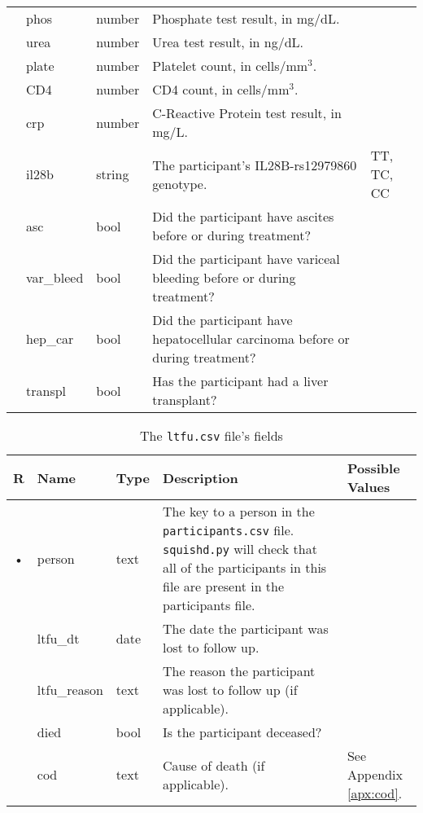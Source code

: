 \documentclass{article}
\begin{document}
\begin{table}
\begin{tabular}{cllp{6cm}p{4cm}}
    & phos          & number    & Phosphate test result, in mg/dL. & \\
    & urea          & number    & Urea test result, in ng/dL. & \\
    & plate         & number    & Platelet count, in cells/mm$^3$. & \\
    & CD4           & number    & CD4 count, in cells/mm$^3$. & \\
    & crp           & number    & C-Reactive Protein test result, in mg/L. & \\
    & il28b         & string    & The participant's IL28B-rs12979860 genotype. & TT, TC, CC \\
    & asc           & bool      & Did the participant have ascites before or during treatment? & \\
    & var\_bleed    & bool      & Did the participant have variceal bleeding before or during treatment? & \\
    & hep\_car      & bool      & Did the participant have hepatocellular carcinoma before or during treatment? & \\
    & transpl       & bool      & Has the participant had a liver transplant? & \\
  \end{tabular}
\end{table}


\begin{table}
  \centering
  \caption{The \texttt{ltfu.csv} file's fields}
  \label{tbl:ltfu.csv}
  \begin{tabular}{cllp{6cm}p{4cm}}
    R & Name            & Type      & Description & Possible Values \\ \hline
    • & person          & text      & The key to a person in the \texttt{participants.csv}
    file. \texttt{squishd.py} will check that all of the participants in this file
    are present in the participants file. & \\
      & ltfu\_dt        & date      & The date the participant was lost to follow up. & \\
      & ltfu\_reason    & text      & The reason the participant was lost to follow up (if applicable). & \\
      & died            & bool      & Is the participant deceased? & \\
      & cod             & text    & Cause of death (if applicable). & See Appendix \ref{apx:cod}.\\
  \end{tabular}
\end{table}
\end{document}

